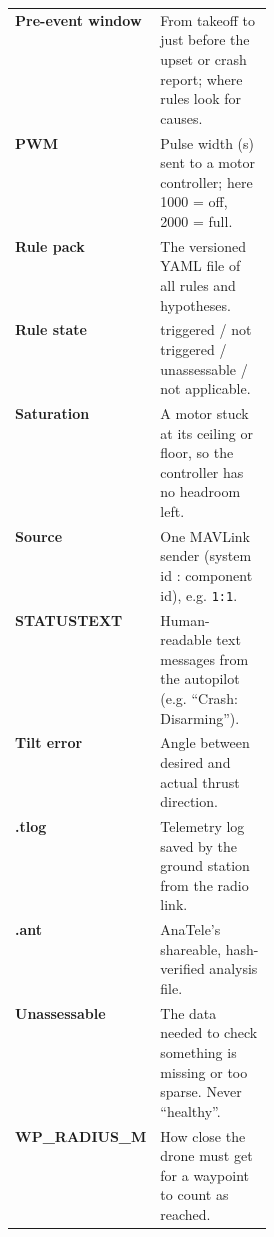 \documentclass[11pt,a4paper,openany]{book}
\begin{document}
\begin{center}
\begin{tabularx}{\linewidth}{p{0.30\linewidth}X}
\textbf{Pre-event window} & From takeoff to just before the upset or crash report; where rules look for causes. \\
\textbf{PWM} & Pulse width (\textmu{}s) sent to a motor controller; here 1000 = off, 2000 = full. \\
\textbf{Rule pack} & The versioned YAML file of all rules and hypotheses. \\
\textbf{Rule state} & triggered / not triggered / unassessable / not applicable. \\
\textbf{Saturation} & A motor stuck at its ceiling or floor, so the controller has no headroom left. \\
\textbf{Source} & One MAVLink sender (system id : component id), e.g. \texttt{1:1}. \\
\textbf{STATUSTEXT} & Human-readable text messages from the autopilot (e.g. ``Crash: Disarming''). \\
\textbf{Tilt error} & Angle between desired and actual thrust direction. \\
\textbf{.tlog} & Telemetry log saved by the ground station from the radio link. \\
\textbf{.ant} & AnaTele's shareable, hash-verified analysis file. \\
\textbf{Unassessable} & The data needed to check something is missing or too sparse. Never ``healthy''. \\
\textbf{WP\_RADIUS\_M} & How close the drone must get for a waypoint to count as reached. \\
\bottomrule
\end{tabularx}
\end{center}
\end{document}
